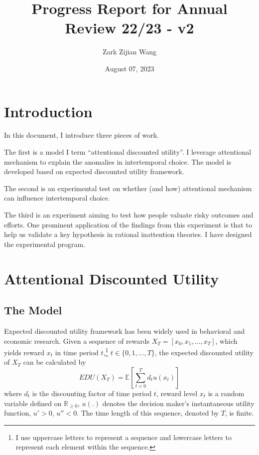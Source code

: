 \documentclass[
  12pt,
]{article}
\title{Progress Report for Annual Review 22/23 - v2}
\author{Zark Zijian Wang}
\date{August 07, 2023}
\begin{document}
\maketitle

\hypertarget{introduction}{%
\section{Introduction}\label{introduction}}

In this document, I introduce three pieces of work.

The first is a model I term ``attentional discounted utility''. I
leverage attentional mechanism to explain the anomalies in intertemporal
choice. The model is developed based on expected discounted utility
framework.

The second is an experimental test on whether (and how) attentional
mechanism can influence intertemporal choice.

The third is an experiment aiming to test how people valuate risky
outcomes and efforts. One prominent application of the findings from
this experiment is that to help us validate a key hypothesis in rational
inattention theories. I have designed the experimental program.

\hypertarget{attentional-discounted-utility}{%
\section{Attentional Discounted
Utility}\label{attentional-discounted-utility}}

\hypertarget{the-model}{%
\subsection{The Model}\label{the-model}}

Expected discounted utility framework has been widely used in behavioral
and economic research. Given a sequence of rewards
\(X_T=[x_0,x_1,...,x_T]\), which yields reward \(x_t\) in time period
\(t\),\footnote{I use uppercase letters to represent a sequence and
  lowercase letters to represent each element within the sequence.}
\(t \in \{0,1,...,T\}\), the expected discounted utility of \(X_T\) can
be calculated by\[
EDU(X_T)= \mathbb{E}\left[\sum_{t=0}^T d_t u(x_t)\right]
\]where \(d_t\) is the discounting factor of time period \(t\), reward
level \(x_t\) is a random variable defined on \(\mathbb{R}_{\geq 0}\),
\(u(.)\) denotes the decision maker's instantaneous utility function,
\(u'>0\), \(u''<0\). The time length of this sequence, denoted by \(T\),
is finite.
\end{document}
